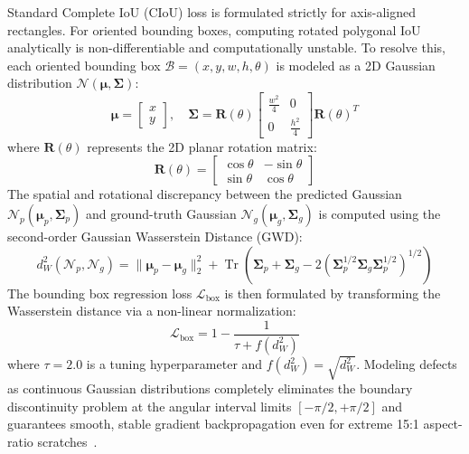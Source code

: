 Standard Complete IoU (CIoU) loss is formulated strictly for axis-aligned rectangles. For oriented bounding boxes, computing rotated polygonal IoU analytically is non-differentiable and computationally unstable. To resolve this, each oriented bounding box $\mathcal{B} = (x, y, w, h, \theta)$ is modeled as a 2D Gaussian distribution $\mathcal{N}(\boldsymbol{\mu}, \boldsymbol{\Sigma})$:
\begin{equation}
\label{eq:gaussian_def}
\boldsymbol{\mu} = \begin{bmatrix} x \\ y \end{bmatrix}, \quad 
\boldsymbol{\Sigma} = \mathbf{R}(\theta) \begin{bmatrix} \frac{w^2}{4} & 0 \\ 0 & \frac{h^2}{4} \end{bmatrix} \mathbf{R}(\theta)^T
\end{equation}
where $\mathbf{R}(\theta)$ represents the 2D planar rotation matrix:
\begin{equation}
\mathbf{R}(\theta) = \begin{bmatrix} \cos\theta & -\sin\theta \\ \sin\theta & \cos\theta \end{bmatrix}
\end{equation}
The spatial and rotational discrepancy between the predicted Gaussian $\mathcal{N}_p(\boldsymbol{\mu}_p, \boldsymbol{\Sigma}_p)$ and ground-truth Gaussian $\mathcal{N}_g(\boldsymbol{\mu}_g, \boldsymbol{\Sigma}_g)$ is computed using the second-order Gaussian Wasserstein Distance (GWD):
\begin{equation}
\label{eq:gwd}
d_W^2(\mathcal{N}_p, \mathcal{N}_g) = \|\boldsymbol{\mu}_p - \boldsymbol{\mu}_g\|_2^2 + \operatorname{Tr}\left(\boldsymbol{\Sigma}_p + \boldsymbol{\Sigma}_g - 2\left(\boldsymbol{\Sigma}_p^{1/2} \boldsymbol{\Sigma}_g \boldsymbol{\Sigma}_p^{1/2}\right)^{1/2}\right)
\end{equation}
The bounding box regression loss $\mathcal{L}_{\text{box}}$ is then formulated by transforming the Wasserstein distance via a non-linear normalization:
\begin{equation}
\mathcal{L}_{\text{box}} = 1 - \frac{1}{\tau + f(d_W^2)}
\end{equation}
where $\tau = 2.0$ is a tuning hyperparameter and $f(d_W^2) = \sqrt{d_W^2}$. Modeling defects as continuous Gaussian distributions completely eliminates the boundary discontinuity problem at the angular interval limits $[-\pi/2, +\pi/2]$ and guarantees smooth, stable gradient backpropagation even for extreme 15:1 aspect-ratio scratches~\cite{deng2024probiou}.

